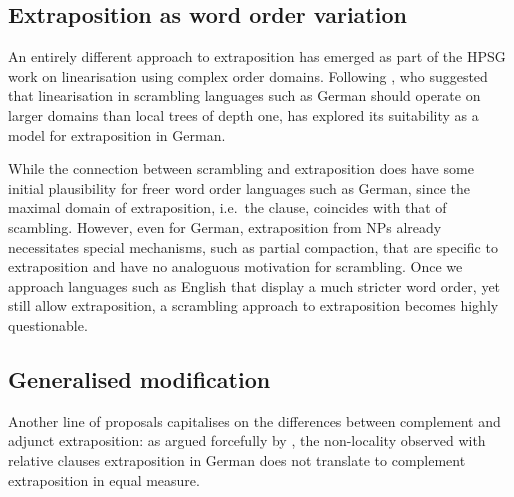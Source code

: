 \documentclass[output=paper
                ,modfonts
                ,nonflat
	        ,collection
	        ,collectionchapter
	        ,collectiontoclongg
 	        ,biblatex
                ,babelshorthands
                ,newtxmath
                ,draftmode
                ,colorlinks, citecolor=brown
]{./langsci/langscibook}
\begin{document}
{\subsection{Extraposition as word order variation}

An entirely different approach to extraposition has emerged as part of
the HPSG work on linearisation using complex order domains. Following
\citet{Reape:94}, who suggested that linearisation in scrambling
languages such as German should operate on larger domains than local
trees of depth one, \citet{Kathol:95b,kathol_a00} has explored its suitability as a model
for extraposition in German.


While the connection between scrambling and extraposition does have
some initial plausibility for freer word order languages such as
German, since the maximal domain of extraposition, i.e.\ the clause,
coincides with that of scambling. However, even for German,
extraposition from NPs already necessitates special mechanisms, such
as partial compaction, that are specific to extraposition and have no
analoguous motivation for scrambling. Once we approach 
 languages such as English that display a much stricter
word order, yet still allow extraposition, a scrambling approach to
extraposition becomes highly questionable.


\subsection{Generalised modification}

Another line of proposals capitalises on the differences between
complement and adjunct extraposition: as argued forcefully by
\citet{kiss_t02nllt}, the non-locality observed with relative clauses
extraposition in German does not translate to complement extraposition
in equal measure.

\begin{exe}
  \ex \label{ex:ExtraNP}
  \begin{xlist}

  \end{xlist}
\end{exe}

}
\end{document}
